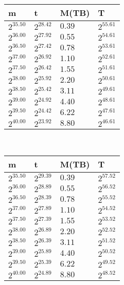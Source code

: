 
 \ 
\begin{tabular}{llll}
m & t & M(TB) & T \\ \hline
$2^{35.50}$ & $2^{28.42}$ & $0.39$ & $2^{55.61}$ \\
$2^{36.00}$ & $2^{27.92}$ & $0.55$ & $2^{54.61}$ \\
$2^{36.50}$ & $2^{27.42}$ & $0.78$ & $2^{53.61}$ \\
$2^{37.00}$ & $2^{26.92}$ & $1.10$ & $2^{52.61}$ \\
$2^{37.50}$ & $2^{26.42}$ & $1.55$ & $2^{51.61}$ \\
$2^{38.00}$ & $2^{25.92}$ & $2.20$ & $2^{50.61}$ \\
$2^{38.50}$ & $2^{25.42}$ & $3.11$ & $2^{49.61}$ \\
$2^{39.00}$ & $2^{24.92}$ & $4.40$ & $2^{48.61}$ \\
$2^{39.50}$ & $2^{24.42}$ & $6.22$ & $2^{47.61}$ \\
$2^{40.00}$ & $2^{23.92}$ & $8.80$ & $2^{46.61}$ \\
\end{tabular}
 \ 
\begin{tabular}{llll}
m & t & M(TB) & T \\ \hline
$2^{35.50}$ & $2^{29.39}$ & $0.39$ & $2^{57.52}$ \\
$2^{36.00}$ & $2^{28.89}$ & $0.55$ & $2^{56.52}$ \\
$2^{36.50}$ & $2^{28.39}$ & $0.78$ & $2^{55.52}$ \\
$2^{37.00}$ & $2^{27.89}$ & $1.10$ & $2^{54.52}$ \\
$2^{37.50}$ & $2^{27.39}$ & $1.55$ & $2^{53.52}$ \\
$2^{38.00}$ & $2^{26.89}$ & $2.20$ & $2^{52.52}$ \\
$2^{38.50}$ & $2^{26.39}$ & $3.11$ & $2^{51.52}$ \\
$2^{39.00}$ & $2^{25.89}$ & $4.40$ & $2^{50.52}$ \\
$2^{39.50}$ & $2^{25.39}$ & $6.22$ & $2^{49.52}$ \\
$2^{40.00}$ & $2^{24.89}$ & $8.80$ & $2^{48.52}$ \\
\end{tabular}
 \ 
